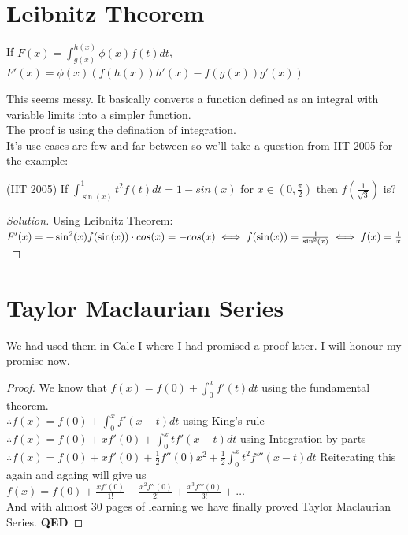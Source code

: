 \section{Leibnitz Theorem}
\begin{theorem}
    If $F(x)=\int^{h(x)}_{g(x)} \phi(x)f(t)dt$,\\
    $F'(x)=\phi(x)(f(h(x))h'(x)-f(g(x))g'(x))$
\end{theorem}
This seems messy. It basically converts a function defined as an integral with variable limits into a simpler function.\\
The proof is using the defination of integration.\\
It's use cases are few and far between so we'll take a question from IIT 2005 for the example:\\
\begin{example}
    (IIT 2005) If $\int^1_{\sin(x)} t^2f(t)dt=1-sin(x)$ for $x \in (0,\frac{\pi}{2})$ then $f(\frac{1}{\sqrt{3}})$ is?
\end{example}
\begin{proof}
    [Solution]
    Using Leibnitz Theorem:\\
    $F'(x)=-\sin^2(x)f(\sin(x)) \cdot cos(x) = -cos(x)
    \iff f(\sin(x))=\frac{1}{\sin^2(x)}\\
    \iff f(x)=\frac{1}{x}$
\end{proof}
\section{Taylor Maclaurian Series}
We had used them in Calc-I where I had promised a proof later. I will honour my promise now.\\
\begin{proof}
    We know that $f(x)=f(0)+\int_0^x f'(t)dt$ using the fundamental theorem.\\
    $\therefore f(x)= f(0)+\int_0^x f'(x-t)dt$ using King's rule\\
    $\therefore f(x) = f(0) + xf'(0)+\int_0^x tf'(x-t)dt$ using Integration by parts\\
    $\therefore f(x)=f(0)+ xf'(0)+ \frac{1}{2}f''(0)x^2+\frac{1}{2} \int_0^x t^2f'''(x-t)dt$ Reiterating this again and againg will give us\\
    $f(x)= f(0)+\frac{xf'(0)}{1!}+\frac{x^2f''(0)}{2!}+\frac{x^3f'''(0)}{3!}+\dots$\\
    And with almost 30 pages of learning we have finally proved Taylor Maclaurian Series. \textbf{QED}
\end{proof}
